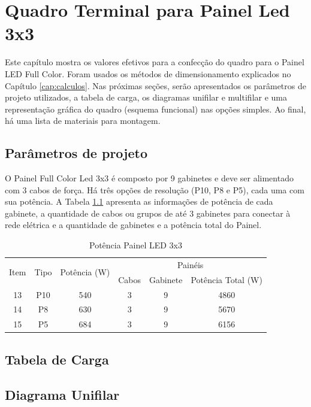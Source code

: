 \chapter{Quadro Terminal para Painel Led 3x3}

Este capítulo mostra os valores efetivos para a confecção do quadro para o Painel LED Full Color. Foram usados os métodos de dimensionamento explicados no Capítulo \ref{cap:calculos}. Nas próximas seções, serão apresentados os parâmetros de projeto utilizados, a tabela de carga, os diagramas unifilar e multifilar e uma representação gráfica do quadro (esquema funcional) nas opções simples. Ao final, há uma lista de materiais para montagem.

\section{Parâmetros de projeto}

O Painel Full Color Led 3x3 é composto por 9 gabinetes e deve ser alimentado com 3 cabos de força. Há três opções de resolução (P10, P8 e P5), cada uma com sua potência. A Tabela \ref{tab:pot_3x3} apresenta as informações de potência de cada gabinete, a quantidade de cabos ou grupos de até 3 gabinetes para conectar à rede elétrica e a quantidade de gabinetes e a potência total do Painel.

\begin{table}[htbp]
\caption{Potência Painel LED 3x3}
\centering
\begin{tabular}{cccccc}
\toprule
\multirow{2}{*}{Item} & \multirow{2}{*}{Tipo} & \multirow{2}{*}{Potência (W)} & \multicolumn{3}{c}{Painéis} \\
\cmidrule{4-6}
& & & Cabos  & Gabinete & Potência Total (W) \\
\midrule


13 & P10 & 540 & 3 & 9 & 4860 \\
14 & P8 & 630 & 3 & 9 & 5670 \\
15 & P5 & 684 & 3 & 9 & 6156 \\


\bottomrule
\end{tabular}
\label{tab:pot_3x3}
\end{table}


\section{Tabela de Carga}
\section{Diagrama Unifilar}
